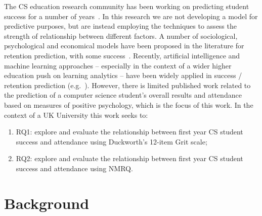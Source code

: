 \documentclass[sigconf]{acmart}
\begin{document}

 The CS education research community has been working on predicting student success for a number of years~\cite{Robins2010}. In this research we are not developing a model for predictive purposes, but are instead employing the techniques to assess the strength of relationship between different factors. A number of sociological, psychological and economical models have been proposed in the literature for retention prediction, with some success~\cite{Seidman2012}. Recently, artificial intelligence and machine learning approaches -- especially in the context of a wider higher education push on learning analytics -- have been widely applied in success / retention prediction (e.g.~\cite{ Liao:2019:RML:3308443.3277569, Ahadi:2015:EML:2787622.2787717,Castro-Wunsch:2017:ENN:3017680.3017792, Quille:2018:PPS:3197091.3197101}).  However, there is limited published work related to the prediction of a computer science student's overall results and attendance based on measures of positive psychology, which is the focus of this work. In the context of a UK University this work seeks to:
\begin{enumerate}
    \item RQ1: explore and evaluate the relationship between first year CS student success and attendance using Duckworth's 12-item Grit scale;
    \item RQ2: explore and evaluate the relationship between first year CS student success and attendance using NMRQ.
\end{enumerate}

\section {Background}

\end{document}
